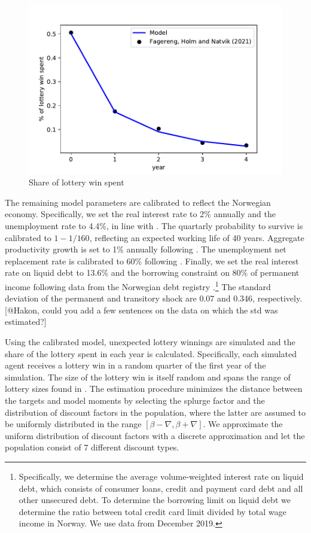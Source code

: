 \documentclass[../HAFiscal]{subfiles}
\begin{document}
\begin{figure}[htb]
	\centering
	\includegraphics[width=0.8\linewidth]{../Code/HA-Models/Target_AggMPCX_LiquWealth/Figures/AggMPC_LotteryWin}
	\caption{Share of lottery win spent}
	\label{fig:aggmpclotterywin}
\end{figure}



The remaining model parameters are calibrated to reflect the Norwegian economy. Specifically, we set the real interest rate to 2\% annually and the unemployment rate to 4.4\%, in line with \citet{aursland_state-dependent_2020}. The quartarly probability to survive is calibrated to $1-1/160$, reflecting an expected working life of 40 years. Aggregate productivity growth is set to 1\% annually following \citet{kravik_navigating_2019}. The unemployment net replacement rate is calibrated to 60\% following \citet{oecd_net_2020}. Finally, we set the real interest rate on liquid debt to 13.6\% and the borrowing constraint on 80\% of permanent income following data from the Norwegian debt registry \citet{gjeldsregistret_nokkeltall_2022}.\footnote{Specifically, we determine the average volume-weighted interest rate on liquid debt, which consists of consumer loans, credit and payment card debt and all other unsecured debt. To determine the borrowing limit on liquid debt we determine the ratio between total credit card limit divided by total wage income in Norway. We use data from December 2019.} The standard deviation of the permanent and transitory shock are 0.07 and 0.346, respectively. [@Hakon, could you add a few sentences on the data on which the std was estimated?]

Using the calibrated model, unexpected lottery winnings are simulated and the share of the lottery spent in each year is calculated. Specifically, each simulated agent receives a lottery win in a random quarter of the first year of the simulation. The size of the lottery win is itself random and spans the range of lottery sizes found in \citet{fagereng_mpc_2021}. The estimation procedure minimizes the distance between the targets and model moments by selecting the splurge factor and the distribution of discount factors in the population, where the latter are assumed to be uniformly distributed in the range $[\beta-\nabla, \beta+\nabla]$. We approximate the uniform distribution of discount factors with a discrete approximation and let the population consist of $7$ different discount types.
\end{document}
